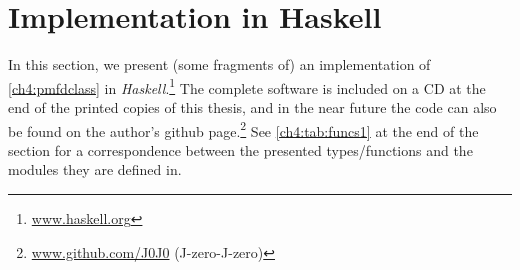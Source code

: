 \newcommand{\framedhslinecorrect}[2]%
  {#1[#2]}

\newcommand{\framedhs}{\sethscode{framedhscode}}


\newenvironment{inlinehscode}%
  {\(\def\column##1##2{}%
   \let\>\undefined\let\<\undefined\let\\\undefined
   \newcommand\>[1][]{}\newcommand\<[1][]{}\newcommand\\[1][]{}%
   \def\fromto##1##2##3{##3}%
   \def\nextline{}}{\) }%

\newcommand{\inlinehs}{\sethscode{inlinehscode}}


\newenvironment{joincode}%
  {\let\orighscode=\hscode
   \let\origendhscode=\endhscode
   \def\endhscode{\def\hscode{\endgroup\def\@currenvir{hscode}\\}\begingroup}
   \orighscode\def\hscode{\endgroup\def\@currenvir{hscode}}}%
  {\origendhscode
   \global\let\hscode=\orighscode
   \global\let\endhscode=\origendhscode}%

\makeatother
\EndFmtInput
%

\section{Implementation in Haskell}
\label{ch4:sec:implementation}
In this section, we present (some fragments of) an implementation of
\cref{ch4:pmfdclass} in
\emph{Haskell}.\footnote{\href{http://www.haskell.org/}{\url{www.haskell.org}}}
The complete software is included on a CD at the end of the printed copies of
this thesis, and in the near future the code can also be found on the author's
github page.\footnote{%
\href{https://github.com/J0J0/}{\url{www.github.com/J0J0}}%
\;\;(J-zero-J-zero)}
See \cref{ch4:tab:funcs1} at the end of the section for a correspondence between
the presented types/functions and the modules they are defined in.

